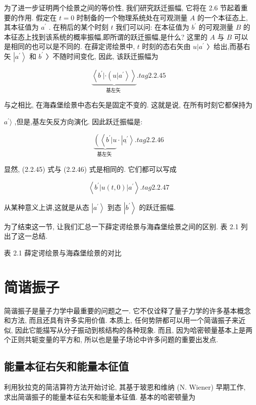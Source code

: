 \documentclass[lang=cn,newtx,10pt,scheme=chinese,thmcnt=section]{elegantbook}
\begin{document}
为了进一步证明两个绘景之间的等价性, 我们研究跃迁振幅, 它将在 2.6 节起着重要的作用. 假定在 $t = 0$ 时制备的一个物理系统处在可观测量 $A$ 的一个本征态上,其本征值为 ${a}^{\prime }$ . 在稍后的某个时刻 $t$ 我们可以问: 在本征值为 ${b}^{\prime }$ 的可观测量 $B$ 的本征态上找到该系统的概率振幅,即所谓的跃迁振幅,是什么? 这里的 $A$ 与 $B$ 可以是相同的也可以是不同的. 在薛定谔绘景中, $t$ 时刻的态右矢由 $u | {a}^{\prime }$ 〉给出,而基右矢 $\left| {a}^{\prime }\right\rangle$ 和 ${b}^{\prime }$ 〉不随时间变化, 因此, 该跃迁振幅为

$$
\underset{\text{基左矢 }}{\underbrace{\left\langle {b}^{\prime } | \cdot \left( u | {a}^{\prime }\right\rangle \right\rangle }}. tag{2.2.45}
$$

与之相比, 在海森堡绘景中态右矢是固定不变的. 这就是说, 在所有时刻它都保持为

${a}^{\prime }\rangle$ ,但是,基左矢反方向演化. 因此跃迁振幅是:

$$
\underset{\text{基左矢 }}{\underbrace{\left( \left\langle {b}^{\prime } | u\right. \right. }} \cdot \left| \underline{{a}^{\prime }}\right\rangle . tag{2.2.46}
$$

显然, (2.2.45) 式与 (2.2.46) 式是相同的. 它们都可以写成

$$
\left\langle {{b}^{\prime }\left| {u\left( {t,0}\right) }\right| {a}^{\prime }}\right\rangle . tag{2.2.47}
$$

从某种意义上讲,这就是从态 $\left| {a}^{\prime }\right\rangle$ 到态 $\left| {b}^{\prime }\right\rangle$ 的跃迁振幅.

为了结束这一节, 让我们汇总一下薛定谔绘景与海森堡绘景之间的区别. 表 2.1 列出了这一总结.

表 2.1 薛定谔绘景与海森堡绘景的对比


\section{简谐振子}
简谐振子是量子力学中最重要的问题之一. 它不仅诠释了量子力学的许多基本概念和方法, 而且还具有许多实用价值. 本质上, 任何势阱都可以用一个简谐振子来近似, 因此它能描写从分子振动到核结构的各种现象. 而且, 因为哈密顿量基本上是两个正则共轭变量的平方和, 所以也是量子场论中许多问题的重要出发点.
\subsection*{能量本征右矢和能量本征值}
利用狄拉克的简洁算符方法开始讨论, 其基于玻恩和维纳 (N. Wiener) 早期工作, 求出简谐振子的能量本征右矢和能量本征值. 基本的哈密顿量为
\end{document}
